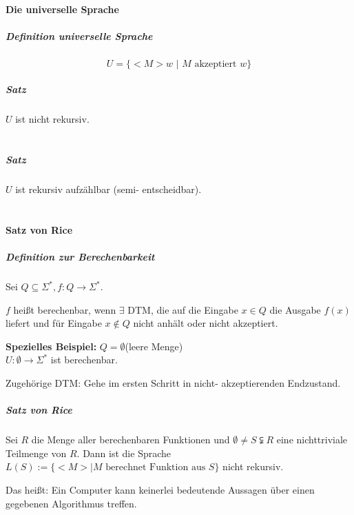 \documentclass[fleqn]{scrartcl}
\begin{document}
\paragraph{Die universelle Sprache}
\subparagraph{Definition universelle Sprache}
\[U = \{<M>w \,\,|\,\,M \text{ akzeptiert } w\}\]
\subparagraph{Satz} $U$ ist nicht rekursiv.\\\\

\subparagraph{Satz} $U$ ist rekursiv aufzählbar (semi- entscheidbar).\\\\

\paragraph{Satz von Rice}
\subparagraph{Definition zur Berechenbarkeit} Sei $Q \subseteq \Sigma^*, f : Q \rightarrow \Sigma^*$.

$f$ heißt berechenbar, wenn $\exists$ DTM, die auf die Eingabe $x \in Q$ die Ausgabe $f(x)$ liefert und für Eingabe $x \notin Q$ nicht anhält oder nicht akzeptiert.

\textbf{Spezielles Beispiel:}
$Q=\emptyset$(leere Menge)\\
$U:\emptyset \rightarrow \Sigma^*$ ist berechenbar.

Zugehörige DTM: Gehe im ersten Schritt in nicht- akzeptierenden Endzustand.

\subparagraph{Satz von Rice} Sei $R$ die Menge aller berechenbaren Funktionen und $\emptyset \neq S \subsetneqq R$ eine nichttriviale Teilmenge von $R$. Dann ist die Sprache $L(S) := \{<M> | M \text{ berechnet Funktion aus } S\}$ nicht rekursiv.

Das heißt: Ein Computer kann keinerlei bedeutende Aussagen über einen gegebenen Algorithmus treffen.
\end{document}

